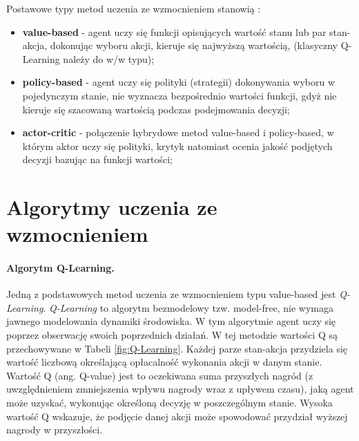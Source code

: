 \documentclass{iiuwb}
\begin{document}
Postawowe typy metod uczenia ze wzmocnieniem stanowią \cite{suttonbarto2018}:
\begin{itemize}
    \item \textbf{value-based} - agent uczy się funkcji opisujących wartość stanu lub par stan-akcja, dokonując wyboru akcji, kieruje się najwyższą wartością, (klasyczny Q-Learning należy do w/w typu);

    \item \textbf{policy-based} - agent uczy się polityki (strategii) dokonywania wyboru w pojedynczym stanie, nie wyznacza bezpośrednio wartości funkcji, gdyż nie kieruje się szacowaną wartością podczas podejmowania decyzji; 

    \item \textbf{actor-critic} - połączenie hybrydowe metod value-based i policy-based, w którym aktor uczy się polityki, krytyk natomiast ocenia jakość podjętych decyzji bazując na funkcji wartości;

    

\end{itemize}



\section{Algorytmy uczenia ze wzmocnieniem}

\paragraph{Algorytm Q-Learning.} 
Jedną z podstawowych metod uczenia ze wzmocnieniem typu value-based jest \textit{Q-Learning}. \textit{Q-Learning} to algorytm bezmodelowy tzw. model-free, 
nie wymaga jawnego modelowania dynamiki środowiska.
W tym algorytmie agent uczy się poprzez obserwację swoich poprzednich działań. W tej metodzie wartości Q są przechowywane w Tabeli \ref{fig:Q-Learning}. Każdej parze stan-akcja przydziela się wartość liczbową określającą opłacalność wykonania akcji w danym stanie. Wartość Q (ang. Q-value) jest to oczekiwana suma przyszłych nagród (z uwzględnieniem zmniejszenia wpływu nagrody wraz z upływem czasu), jaką agent może uzyskać, wykonując określoną decyzję w poszczególnym stanie. Wysoka wartość Q wskazuje, że podjęcie danej akcji może spowodować przydział wyższej nagrody w przyszłości.
\end{document}
